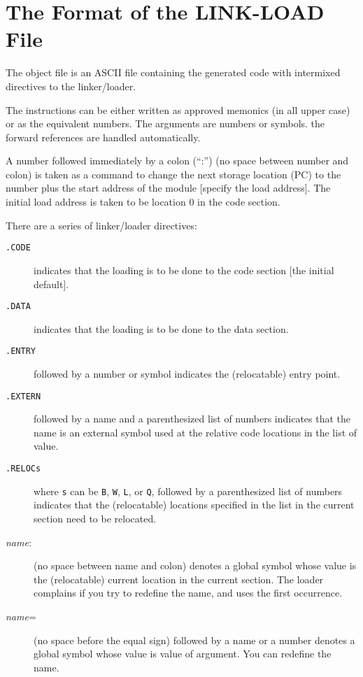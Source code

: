 \documentclass {report}
\begin{document}
\section {The Format of the LINK-LOAD File}

The object file is an ASCII file containing  the generated code with 
intermixed directives to the linker/loader.

The instructions can be either written as approved memonics (in all upper
case) or as the equivalent numbers.  The arguments are numbers or symbols.
the forward references are handled automatically.

A number followed immediately by a colon (``:'') 
(no space between number and colon) is taken as a command 
to change the next storage location (PC)  to the number 
plus the start address of the module [specify the load address].  
The initial load address is taken to be location 0 in the code section. 

There are a series of linker/loader directives:\begin {description}
\item [{\tt .CODE}] indicates that the loading is to be done to the 
code section [the initial default].  
\item [{\tt .DATA}] indicates that 
the loading is to be done to the data section.
\item [{\tt .ENTRY}] followed by a number or symbol indicates the 
(relocatable) entry point.
\item [{\tt .EXTERN}] followed by a name and a parenthesized
list of numbers indicates that the name is an external symbol used at the
relative code locations in the list of value.
\item [{\tt .RELOCs}] where {\tt s} can be {\tt B}, {\tt W}, {\tt L}, or 
{\tt Q}, followed by a parenthesized list of numbers indicates
that the (relocatable) locations specified in the list 
in the current section need to be relocated.
\item [{\it name}:] (no space between name and colon) denotes a global symbol 
whose value is the (relocatable) current location in the current section.
The loader complains if you try to redefine the name, and uses the first 
occurrence.
\item [{\it name}=] (no space before the equal sign)
followed by a name or a number 
denotes a global symbol whose value is value of argument.
You can redefine the name.
\end {description}
\end{document}
